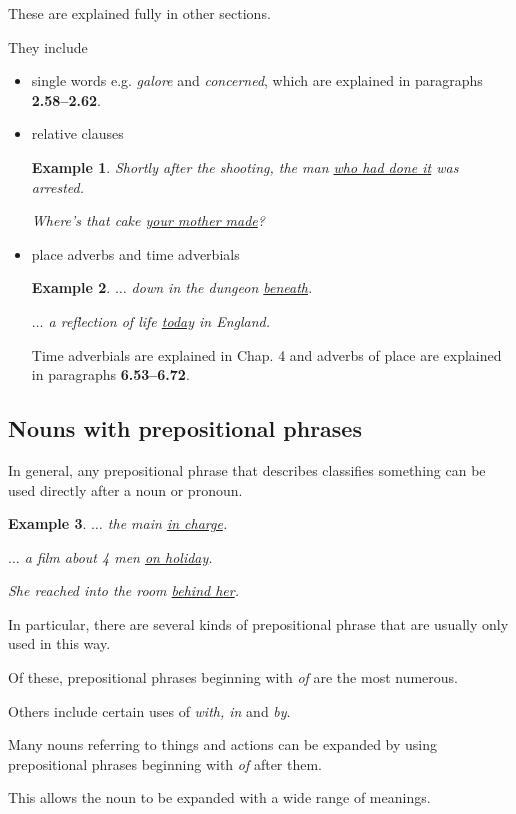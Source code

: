 \documentclass[oneside]{book}
\numberwithin{equation}{section}
\newtheorem{example}{Example}[section]
\begin{document}
These are explained fully in other sections.

They include
\begin{itemize}
    \item single words e.g. \textit{galore} and \textit{concerned}, which are explained in paragraphs \textbf{2.58--2.62}.
    \item relative clauses
    \begin{example}
        Shortly after the shooting, the man \underline{who had done it} was arrested.
        
        Where's that cake \underline{your mother made}?
    \end{example}
    \item place adverbs and time adverbials
    \begin{example}
        $\ldots$ down in the dungeon \underline{beneath}.
        
        $\ldots$ a reflection of life \underline{today} in England.
    \end{example}
    Time adverbials are explained in Chap. 4 and adverbs of place are explained in paragraphs \textbf{6.53--6.72}.
\end{itemize}

\subsection{Nouns with prepositional phrases}
\noindent{} In general, any prepositional phrase that describes classifies something can be used directly after a noun or pronoun.
\begin{example}
    $\ldots$ the main \underline{in charge}.
    
    $\ldots$ a film about 4 men \underline{on holiday}.
    
    She reached into the room \underline{behind her}.
\end{example}
%
\noindent{} In particular, there are several kinds of prepositional phrase that are usually only used in this way.

Of these, prepositional phrases beginning with \textit{of} are the most numerous.

Others include certain uses of \textit{with, in} and \textit{by}.

%
\noindent{} Many nouns referring to things and actions can be expanded by using prepositional phrases beginning with \textit{of} after them.

This allows the noun to be expanded with a wide range of meanings.
\end{document}
